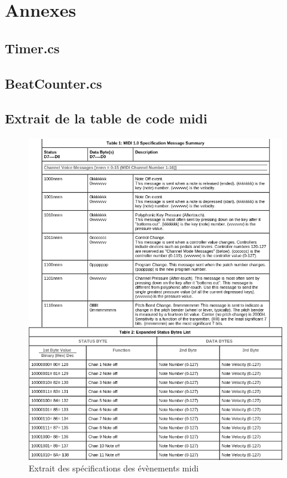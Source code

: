 \chapter{Annexes}

\section*{Timer.cs}

\section*{BeatCounter.cs}


\section*{Extrait de la table de code midi}
\begin{figure}[H]\centering
  \includegraphics[scale=0.8]{./img/midi_spec.png}
  \caption{Extrait des spécifications des évènements midi}
\end{figure}

